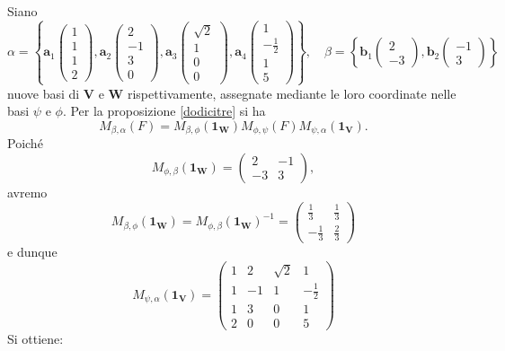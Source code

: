 \documentclass{article}
\theoremstyle{plain}
\theoremstyle{definition}
\theoremstyle{remark}
\begin{document}
Siano
\[\alpha = \left\{\mathbf{a}_1\begin{pmatrix}1\\1\\1\\2\end{pmatrix}, \mathbf{a}_2\begin{pmatrix}2\\-1\\3\\0\end{pmatrix}, \mathbf{a}_3\begin{pmatrix}\sqrt{2}\\1\\0\\0\end{pmatrix}, \mathbf{a}_4\begin{pmatrix}1\\-\frac{1}{2}\\1\\5\end{pmatrix}\right\},\quad\beta = \left\{\mathbf{b}_1\begin{pmatrix}2\\-3\end{pmatrix}, \mathbf{b}_2\begin{pmatrix}-1\\3\end{pmatrix}\right\}\]
nuove basi di $\mathbf{V}$ e $\mathbf{W}$ rispettivamente, assegnate mediante le loro coordinate nelle basi $\psi$ e $\phi$. Per la proposizione \ref{dodicitre} si ha
\[M_{\beta,\alpha}(F) = M_{\beta,\phi}(\mathbf{1_W})M_{\phi,\psi}(F)M_{\psi,\alpha}(\mathbf{1_V}).\]
Poiché
\[M_{\phi,\beta}(\mathbf{1_W}) = \begin{pmatrix} 2 & -1 \\ -3 & 3 \end{pmatrix},\]
avremo
\[
M_{\beta,\phi}(\mathbf{1_W}) = M_{\phi,\beta}(\mathbf{1_W})^{-1} = 
\begin{pmatrix} 
\frac{1}{3} & \frac{1}{3} \\ 
-\frac{1}{3} & \frac{2}{3} 
\end{pmatrix}
\]
e dunque
\[
M_{\psi,\alpha}(\mathbf{1_V}) = 
\begin{pmatrix}
1 & 2 & \sqrt{2} & 1 \\
1 & -1 & 1 & -\frac{1}{2} \\
1 & 3 & 0 & 1 \\
2 & 0 & 0 & 5
\end{pmatrix}
\]
Si ottiene:
\end{document}
